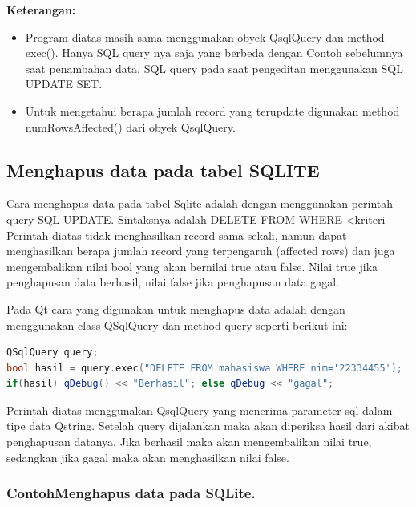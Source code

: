 \textbf{Keterangan:}

\begin{itemize}

\item
Program diatas masih sama menggunakan obyek QsqlQuery dan method
exec(). Hanya SQL query nya saja yang berbeda dengan Contoh sebelumnya
saat penambahan data. SQL query pada saat pengeditan menggunakan SQL
UPDATE SET.
\item
Untuk mengetahui berapa jumlah record yang terupdate digunakan method
numRowsAffected() dari obyek QsqlQuery.
\end{itemize}

\subsection{Menghapus data pada tabel SQLITE}\label{menghapus-data-pada-tabel-sqlite}

Cara menghapus data pada tabel Sqlite adalah dengan menggunakan perintah
query SQL UPDATE. Sintaksnya adalah DELETE FROM WHERE \textless{}kriteri
Perintah diatas tidak menghasilkan record sama sekali, namun dapat
menghasilkan berapa jumlah record yang terpengaruh (affected rows) dan
juga mengembalikan nilai bool yang akan bernilai true atau false. Nilai
true jika penghapusan data berhasil, nilai false jika penghapusan data
gagal.

Pada Qt cara yang digunakan untuk menghapus data adalah dengan
menggunakan class QSqlQuery dan method query seperti berikut ini:

\begin{lstlisting}[language=c++, caption=menghapus data adalah dengan menggunakan class QSqlQuery dan method query]
QSqlQuery query;
bool hasil = query.exec("DELETE FROM mahasiswa WHERE nim='22334455');
if(hasil) qDebug() << "Berhasil"; else qDebug << "gagal";
\end{lstlisting}

Perintah diatas menggunakan QsqlQuery yang menerima parameter sql dalam
tipe data Qstring. Setelah query dijalankan maka akan diperiksa hasil
dari akibat penghapusan datanya. Jika berhasil maka akan mengembalikan
nilai true, sedangkan jika gagal maka akan menghasilkan nilai false.

\subsubsection*{ContohMenghapus data pada SQLite.}

